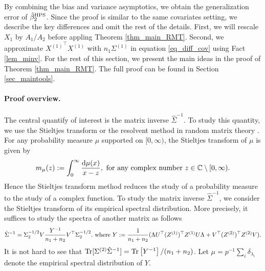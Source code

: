 By combining the bias and variance asymptotics, we obtain the generalization error of $\hat{\beta}_2^{\textup{HPS}}$.
Since the proof is similar to the same covariates setting, we describe the key differences and omit the rest of the details.
First, we will rescale $X_1$ by $A_1 / A_2$ before appling Theorem \ref{thm_main_RMT}.
Second, we approximate ${X^{(1)}}^{\top}X^{(1)}$ with $n_1 \Sigma^{(1)}$ in equation \eqref{eq_diff_cov} using Fact \ref{lem_minv}.
For the rest of this section, we present the main ideas in the proof of Theorem \ref{thm_main_RMT}.
The full proof can be found in Section \ref{sec_maintools}.

\paragraph{Proof overview.} The central quantify of interest is the matrix inverse $\hat{\Sigma}^{-1}$.
To study this quantity, we use the Stieltjes transform or the resolvent method in random matrix theory \cite{bai2009spectral,tao2012topics,erdos2017dynamical}.
For any probability measure $\mu$ supported on $[0,\infty)$, the Stieltjes transform of $\mu$ is given by
$$m_\mu(z):= \int_0^\infty \frac{\mathrm{d}\mu(x)}{x-z}, \text{ for any complex number } z\in \mathbb{C}\setminus [0,\infty).$$
Hence the Stieltjes transform method reduces the study of a probability measure to the study of a complex function.
To study the matrix inverse $\hat{\Sigma}^{-1}$, we consider the Stieltjes transform of its empirical spectral distribution.
More precisely, it suffices to study the spectra of another matrix as follows
\begin{align}\label{eigen2extra}
	\hat{\Sigma}^{-1}= \Sigma_2^{-1/2}V \frac{Y^{-1}}{n_1 + n_2} V^\top\Sigma_2^{-1/2}. \text{ where } Y := \frac{1}{n_1 + n_2}(\Lambda U^\top (Z^{(1)})^\top Z^{(1)} U\Lambda  + V^\top (Z^{(2)})^\top Z^{(2)}V).
\end{align}
It is not hard to see that $\operatorname{Tr}[\Sigma^{(2)} \hat{\Sigma}^{-1}] = \operatorname{Tr}\left[Y^{-1}\right] / (n_1 + n_2)$.
Let $\mu=p^{-1}\sum_{i} \delta_{\lambda_i}$ denote the empirical spectral distribution of $Y$.
